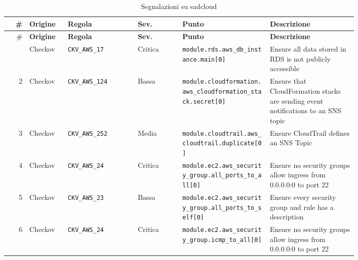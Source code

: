 \begingroup\linespread{1.0}\footnotesize\selectfont\setlength{\tabcolsep}{4pt}
\begin{longtable}{@{}r >{\raggedright\arraybackslash}p{0.11\linewidth} >{\raggedright\arraybackslash}p{0.2\linewidth} l >{\raggedright\arraybackslash}p{0.25\linewidth} >{\raggedright\arraybackslash}p{0.25\linewidth}@{}}
\caption{Segnalazioni su sadcloud}\label{tab:app-sadcloud}\\
\toprule
\# & \textbf{Origine} & \textbf{Regola} & \textbf{Sev.} & \textbf{Punto} & \textbf{Descrizione}\\
\midrule\endfirsthead
\toprule
\# & \textbf{Origine} & \textbf{Regola} & \textbf{Sev.} & \textbf{Punto} & \textbf{Descrizione}\\
\midrule\endhead
\bottomrule\endfoot
1 & Checkov & \texttt{CKV\_\allowbreak{}AWS\_\allowbreak{}17} & Critica & \texttt{module.\allowbreak{}rds.\allowbreak{}aws\_\allowbreak{}db\_\allowbreak{}instance.\allowbreak{}main[0]} & Ensure all data stored in RDS is not publicly accessible\\
2 & Checkov & \texttt{CKV\_\allowbreak{}AWS\_\allowbreak{}124} & Bassa & \texttt{module.\allowbreak{}cloudforma\allowbreak{}tion.\allowbreak{}aws\_\allowbreak{}cloudforma\allowbreak{}tion\_\allowbreak{}stack.\allowbreak{}secret[0]} & Ensure that CloudFormation stacks are sending event notifications to an SNS topic\\
3 & Checkov & \texttt{CKV\_\allowbreak{}AWS\_\allowbreak{}252} & Media & \texttt{module.\allowbreak{}cloudtrail.\allowbreak{}aws\_\allowbreak{}cloudtrail.\allowbreak{}duplicate[0]} & Ensure CloudTrail defines an SNS Topic\\
4 & Checkov & \texttt{CKV\_\allowbreak{}AWS\_\allowbreak{}24} & Critica & \texttt{module.\allowbreak{}ec2.\allowbreak{}aws\_\allowbreak{}security\_\allowbreak{}group.\allowbreak{}all\_\allowbreak{}ports\_\allowbreak{}to\_\allowbreak{}all[0]} & Ensure no security groups allow ingress from 0.0.0.0:0 to port 22\\
5 & Checkov & \texttt{CKV\_\allowbreak{}AWS\_\allowbreak{}23} & Bassa & \texttt{module.\allowbreak{}ec2.\allowbreak{}aws\_\allowbreak{}security\_\allowbreak{}group.\allowbreak{}all\_\allowbreak{}ports\_\allowbreak{}to\_\allowbreak{}self[0]} & Ensure every security group and rule has a description\\
6 & Checkov & \texttt{CKV\_\allowbreak{}AWS\_\allowbreak{}24} & Critica & \texttt{module.\allowbreak{}ec2.\allowbreak{}aws\_\allowbreak{}security\_\allowbreak{}group.\allowbreak{}icmp\_\allowbreak{}to\_\allowbreak{}all[0]} & Ensure no security groups allow ingress from 0.0.0.0:0 to port 22\\

\end{longtable}
